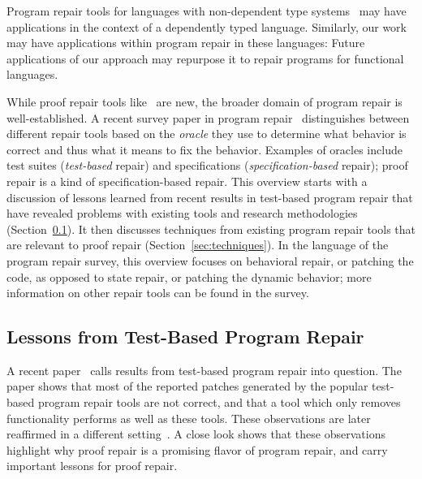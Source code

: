 Program repair tools for 
languages with non-dependent type 
systems~\cite{Pei:2014:APR:2731750.2731779, Long:2016:APG:2837614.2837617, Le:2017:SSS:3106237.3106309, Mechtaev:2016:ASM:2884781.2884807, Monperrus2015} 
may have applications in the context of a dependently typed language.
Similarly, our work may have applications within program repair in these languages:
Future applications of our approach may repurpose it to repair programs for functional languages.


While proof repair tools like \sysname\ are new, the broader domain of program repair is well-established.
A recent survey paper in program repair~\cite{Monperrus:2018:ASR:3177787.3105906} distinguishes between different repair tools
based on the \textit{oracle} they use to determine what behavior is correct and thus what it means to fix the behavior. 
Examples of oracles include test suites (\textit{test-based} repair) and specifications (\textit{specification-based} repair);
proof repair is a kind of specification-based repair.
This overview starts with a discussion of lessons learned from recent results in test-based program repair that have revealed
problems with existing tools and research methodologies (Section~\ref{sec:lessons}). It then discusses
techniques from existing program repair tools that are relevant to proof repair (Section~\ref{sec:techniques}). 
In the language of the program repair survey, %
this overview focuses on behavioral repair, or patching the code, as opposed to state repair, or patching the dynamic behavior;
more information on other repair tools %
can be found in the survey.

\subsection{Lessons from Test-Based Program Repair}
\label{sec:lessons}

A recent paper~\cite{Qi:2015:APP:2771783.2771791} calls results from test-based program repair into
question. The paper shows that most of the reported patches generated by the popular test-based program repair tools
are not correct, and that a tool which only removes functionality
performs as well %
as these tools. These observations %
are later reaffirmed in a different setting~\cite{DBLP:journals/corr/abs-1811-02429}.
A close look shows that these observations highlight why proof repair
is a promising flavor of program repair, and carry important lessons
for proof repair.

